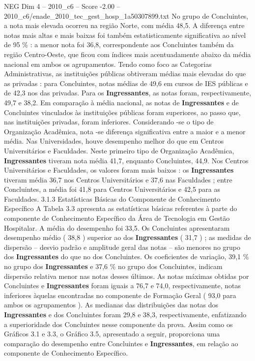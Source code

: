\begin{textsample}{NEG Dim 4 – 2010\_c6 – Score -2.00 – 2010\_c6/enade\_2010\_tec\_gest\_hosp\_1a50307899.txt}
No grupo de Concluintes, a nota mais elevada ocorreu na região Norte, com média 48,5.
A diferença entre notas mais altas e mais baixas foi também estatisticamente significativa ao nível de 95 \% : a menor nota foi 36,8, correspondente aos Concluintes também da região Centro-Oeste, que ficou com índices mais acentuadamente abaixo da média nacional em ambos os agrupamentos.
Tendo como foco as Categorias Administrativas, as instituições públicas obtiveram médias mais elevadas do que as privadas : para Concluintes, notas médias de 49,6 em cursos de IES públicas e de 42,3 nos das privadas.
Para os \textbf{Ingressantes}, as notas foram, respectivamente, 49,7 e 38,2.
Em comparação à média nacional, as notas de \textbf{Ingressantes} e de Concluintes vinculados às instituições públicas foram superiores, ao passo que, nas instituições privadas, foram inferiores.
Considerando -se o tipo de Organização Acadêmica, nota -se diferença significativa entre a maior e a menor média.
Nas Universidades, houve desempenho melhor do que em Centros Universitários e Faculdades.
Neste primeiro tipo de Organização Acadêmica, \textbf{Ingressantes} tiveram nota média 41,7, enquanto Concluintes, 44,9.
Nos Centros Universitários e Faculdades, os valores foram mais baixos : os \textbf{Ingressantes} tiveram média 36,7 nos Centros Universitários e 37,6 nas Faculdades ; entre Concluintes, a média foi 41,8 para Centros Universitários e 42,5 para as Faculdades. 3.1.3 Estatísticas Básicas do Componente de Conhecimento Específico A Tabela 3.3 apresenta as estatísticas básicas referentes à parte do componente de Conhecimento Específico da Área de Tecnologia em Gestão Hospitalar.
A média do desempenho foi 33,5.
Os Concluintes apresentaram desempenho médio ( 38,8 ) superior ao dos \textbf{Ingressantes} ( 31,7 ) ; as medidas de dispersão – desvio padrão e amplitude geral das notas – são menores no grupo dos \textbf{Ingressantes} do que no dos Concluintes.
Os coeficientes de variação, 39,1 \% no grupo dos \textbf{Ingressantes} e 37,6 \% no grupo dos Concluintes, indicam dispersão relativa menor nas notas desses últimos.
As notas máximas obtidas por Concluintes e \textbf{Ingressantes} foram iguais a 76,7 e 74,0, respectivamente, notas inferiores àquelas encontradas no componente de Formação Geral ( 93,0 para ambos os agrupamentos ).
As medianas das distribuições das notas dos \textbf{Ingressantes} e dos Concluintes foram 29,8 e 38,3, respectivamente, enfatizando a superioridade dos Concluintes nesse componente da prova.
Assim como os Gráficos 3.1 e 3.3, o Gráfico 3.5, apresentado a seguir, proporciona uma comparação do desempenho entre Concluintes e \textbf{Ingressantes}, em relação ao componente de Conhecimento Específico.

\end{textsample}
